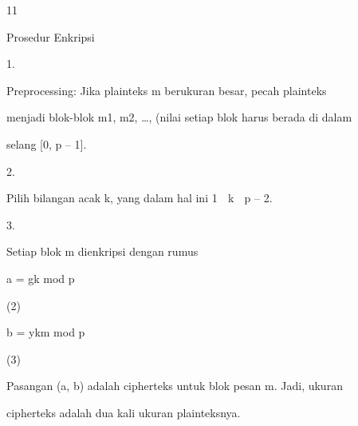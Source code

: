 \documentclass{article}
\begin{document}

11

Prosedur Enkripsi 

1.

Preprocessing: Jika plainteks m berukuran besar, pecah plainteks 

menjadi blok-blok m1, m2, …, (nilai setiap blok harus berada di dalam 

selang [0, p – 1].

2.

Pilih bilangan acak k, yang dalam hal ini 1  k  p – 2. 

3.

Setiap blok m dienkripsi dengan rumus



a = gk mod p  





(2)



b = ykm mod p 





(3)


Pasangan (a, b) adalah cipherteks untuk blok pesan m. Jadi, ukuran 

cipherteks adalah dua kali ukuran plainteksnya.
\end{document}
